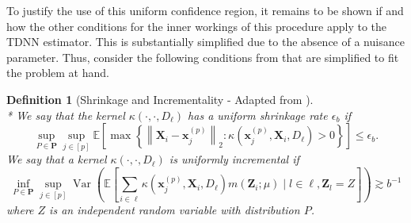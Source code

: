 \documentclass[letterpaper,10pt]{article}
\numberwithin{equation}{section}
\numberwithin{thm}{section}
\newtheorem{dfn}{Definition}
\numberwithin{lem}{section}
\numberwithin{cor}{section}
\newcommand{\1}{\mathbb{1}}
\begin{document}
To justify the use of this uniform confidence region, it remains to be shown if and how the other conditions for the inner workings of this procedure apply to the TDNN estimator.
This is substantially simplified due to the absence of a nuisance parameter.
Thus, consider the following conditions from \cite{ritzwoller_uniform_2024} that are simplified to fit the problem at hand.


\begin{dfn}[Shrinkage and Incrementality - Adapted from \citet{ritzwoller_uniform_2024}]\mbox{}\\*
	We say that the kernel $\kappa\left(\cdot, \cdot, D_{\ell}\right)$ has a uniform shrinkage rate $\epsilon_b$ if
	\begin{equation}
		\sup_{P \in \mathbf{P}} \sup_{j \in[p]}
		\mathbb{E}\left[\max \left\{\left\|\mathbf{X}_i-\mathbf{x}^{(p)}_{j}\right\|_{2}: \kappa\left(\mathbf{x}^{(p)}_{j}, \mathbf{X}_i, D_{\ell}\right)>0\right\}\right]
		\leq \epsilon_b .
	\end{equation}
	We say that a kernel $\kappa\left(\cdot, \cdot, D_{\ell}\right)$ is uniformly incremental if
	\begin{equation}
		\inf_{P \in \mathbf{P}} \sup_{j \in[p]}
		\operatorname{Var}\left(\mathbb{E}\left[\sum_{i \in \ell} \kappa\left(\mathbf{x}^{(p)}_{j}, \mathbf{X}_i, D_{\ell}\right) m\left(\mathbf{Z}_i ; \mu\right) \mid l \in \ell, \mathbf{Z}_l = Z\right]\right)
		\gtrsim b^{-1}
	\end{equation}
	where $Z$ is an independent random variable with distribution $P$.
\end{dfn}
\end{document}
